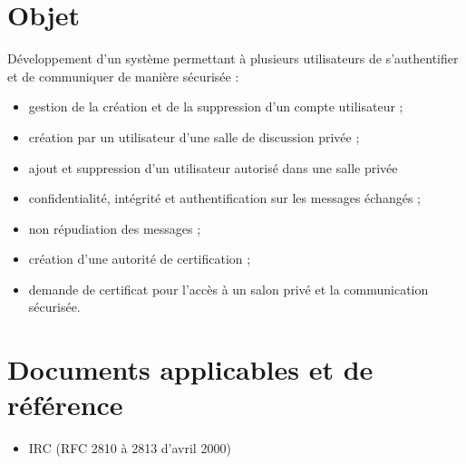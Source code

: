 \documentclass[a4paper,11pt,french]{article}
\begin{document}
\section{Objet}
Développement d'un système permettant à plusieurs utilisateurs de s'authentifier et de communiquer de manière sécurisée :
\begin{itemize}
\item gestion de la création et de la suppression d'un compte utilisateur ;
\item création par un utilisateur d'une salle de discussion privée ;
\item ajout et suppression d'un utilisateur autorisé dans une salle privée
\item confidentialité, intégrité et authentification sur les messages échangés ;
\item non répudiation des messages ;
\item création d'une autorité de certification ;
\item demande de certificat pour l'accès à un salon privé et la communication sécurisée.
\end{itemize}

\section{Documents applicables et de référence}
\begin{itemize}
\item IRC (RFC 2810 à 2813 d'avril 2000)
\end{itemize}

\end{document}
